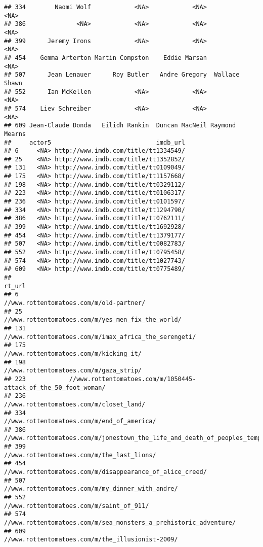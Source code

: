 \documentclass[]{article}
\begin{document}
\begin{verbatim}
## 334        Naomi Wolf            <NA>            <NA>           <NA>
## 386              <NA>            <NA>            <NA>           <NA>
## 399      Jeremy Irons            <NA>            <NA>           <NA>
## 454    Gemma Arterton Martin Compston    Eddie Marsan           <NA>
## 507      Jean Lenauer      Roy Butler   Andre Gregory  Wallace Shawn
## 552      Ian McKellen            <NA>            <NA>           <NA>
## 574    Liev Schreiber            <NA>            <NA>           <NA>
## 609 Jean-Claude Donda   Eilidh Rankin  Duncan MacNeil Raymond Mearns
##     actor5                             imdb_url
## 6     <NA> http://www.imdb.com/title/tt1334549/
## 25    <NA> http://www.imdb.com/title/tt1352852/
## 131   <NA> http://www.imdb.com/title/tt0109049/
## 175   <NA> http://www.imdb.com/title/tt1157668/
## 198   <NA> http://www.imdb.com/title/tt0329112/
## 223   <NA> http://www.imdb.com/title/tt0106317/
## 236   <NA> http://www.imdb.com/title/tt0101597/
## 334   <NA> http://www.imdb.com/title/tt1294790/
## 386   <NA> http://www.imdb.com/title/tt0762111/
## 399   <NA> http://www.imdb.com/title/tt1692928/
## 454   <NA> http://www.imdb.com/title/tt1379177/
## 507   <NA> http://www.imdb.com/title/tt0082783/
## 552   <NA> http://www.imdb.com/title/tt0795458/
## 574   <NA> http://www.imdb.com/title/tt1027743/
## 609   <NA> http://www.imdb.com/title/tt0775489/
##                                                                         rt_url
## 6                                      //www.rottentomatoes.com/m/old-partner/
## 25                           //www.rottentomatoes.com/m/yes_men_fix_the_world/
## 131                      //www.rottentomatoes.com/m/imax_africa_the_serengeti/
## 175                                     //www.rottentomatoes.com/m/kicking_it/
## 198                                     //www.rottentomatoes.com/m/gaza_strip/
## 223            //www.rottentomatoes.com/m/1050445-attack_of_the_50_foot_woman/
## 236                                    //www.rottentomatoes.com/m/closet_land/
## 334                                 //www.rottentomatoes.com/m/end_of_america/
## 386 //www.rottentomatoes.com/m/jonestown_the_life_and_death_of_peoples_temple/
## 399                                 //www.rottentomatoes.com/m/the_last_lions/
## 454                   //www.rottentomatoes.com/m/disappearance_of_alice_creed/
## 507                           //www.rottentomatoes.com/m/my_dinner_with_andre/
## 552                                   //www.rottentomatoes.com/m/saint_of_911/
## 574           //www.rottentomatoes.com/m/sea_monsters_a_prehistoric_adventure/
## 609                           //www.rottentomatoes.com/m/the_illusionist-2009/
\end{verbatim}
\end{document}

